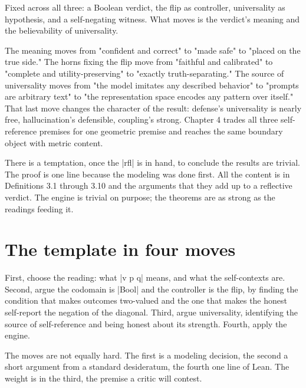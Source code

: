 \documentclass{memoir}
\begin{document}
Fixed across all three: a Boolean verdict, the flip as controller, universality
as hypothesis, and a self-negating witness. What moves is the verdict's meaning
and the believability of universality.

The meaning moves from "confident and correct" to "made safe" to "placed on the
true side." The horns fixing the flip move from "faithful and calibrated" to
"complete and utility-preserving" to "exactly truth-separating." The source of
universality moves from "the model imitates any described behavior" to "prompts
are arbitrary text" to "the representation space encodes any pattern over
itself." That last move changes the character of the result: defense's
universality is nearly free, hallucination's defensible, coupling's strong.
Chapter 4 trades all three self-reference premises for one geometric premise and
reaches the same boundary object with metric content.

There is a temptation, once the \LeanVerb|rfl| is in hand, to conclude the results are
trivial. The proof is one line because the modeling was done first. All the
content is in Definitions 3.1 through 3.10 and the arguments that they add up to
a reflective verdict. The engine is trivial on purpose; the theorems are as
strong as the readings feeding it.



\section{The template in four moves}\label{Two--Schemas--of--Impossibility-005F-005F-005F--Machine--Checked--Limits--of--Trustworthy--Machine--Learning-005F-005F-005F--and--Why--They--Tighten--with--Capability----Three--Trilemmata-005F-005F-005F--One--Theorem----The--template--in--four--moves}

First, choose the reading: what \LeanVerb|v p q| means, and what the self-contexts are.
Second, argue the codomain is \LeanVerb|Bool| and the controller is the flip, by finding
the condition that makes outcomes two-valued and the one that makes the honest
self-report the negation of the diagonal. Third, argue universality, identifying
the source of self-reference and being honest about its strength. Fourth, apply
the engine.

The moves are not equally hard. The first is a modeling decision, the second a
short argument from a standard desideratum, the fourth one line of Lean. The
weight is in the third, the premise a critic will contest.
\end{document}
